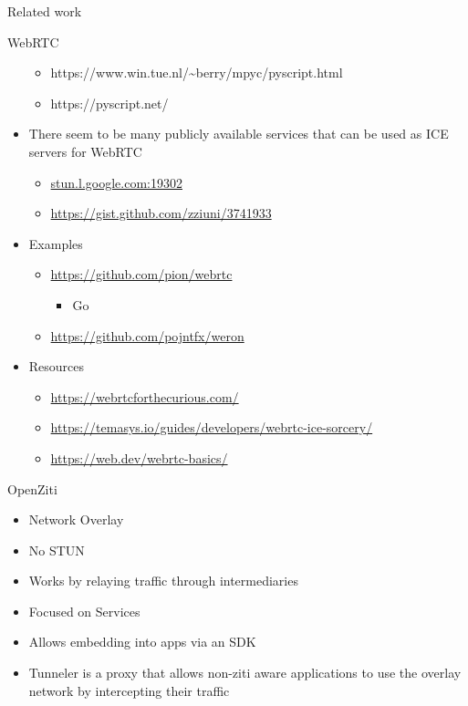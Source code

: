 \begin{frame}[fragile]{Related work}
\begin{block}{WebRTC}
\begin{itemize}
  \begin{itemize}
  \tightlist
  \item
    https://www.win.tue.nl/\textasciitilde berry/mpyc/pyscript.html
  \item
    https://pyscript.net/
  \end{itemize}
\item
  There seem to be many publicly available services that can be used as
  ICE servers for WebRTC

  \begin{itemize}
  \tightlist
  \item
    \href{http://stun.l.google.com:19302/}{stun.l.google.com:19302}
  \item
    \url{https://gist.github.com/zziuni/3741933}
  \end{itemize}
\item
  Examples

  \begin{itemize}
  \tightlist
  \item
    \url{https://github.com/pion/webrtc}

    \begin{itemize}
    \tightlist
    \item
      Go
    \end{itemize}
  \item
    \url{https://github.com/pojntfx/weron}
  \end{itemize}
\item
  Resources

  \begin{itemize}
  \tightlist
  \item
    \url{https://webrtcforthecurious.com/}
  \item
    \url{https://temasys.io/guides/developers/webrtc-ice-sorcery/}
  \item
    \href{https://web.dev/webrtc-basics/\#toc-rtcpeerconnection}{https://web.dev/webrtc-basics/}
  \end{itemize}
\end{itemize}
\end{block}

\begin{block}{OpenZiti}
\protect\hypertarget{openziti}{}
\begin{itemize}
\tightlist
\item
  Network Overlay
\item
  No STUN
\item
  Works by relaying traffic through intermediaries
\item
  Focused on Services
\item
  Allows embedding into apps via an SDK
\item
  Tunneler is a proxy that allows non-ziti aware applications to use the
  overlay network by intercepting their traffic
\end{itemize}
\end{block}
\end{frame}

